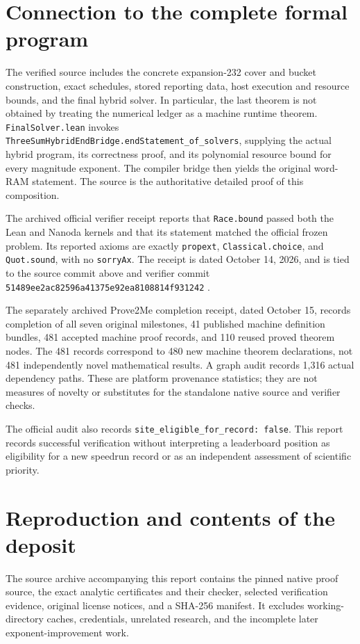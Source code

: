 \documentclass[11pt,a4paper]{article}
\newcommand{\code}[1]{\texttt{#1}}
\begin{document}
\section{Connection to the complete formal program}
The verified source includes the concrete expansion-232 cover and bucket
construction, exact schedules, stored reporting data, host execution and
resource bounds, and the final hybrid solver. In particular, the last
theorem is not obtained by treating the numerical ledger as a machine
runtime theorem. \code{FinalSolver.lean} invokes
\code{ThreeSumHybridEndBridge.endStatement\_of\_solvers}, supplying the
actual hybrid program, its correctness proof, and its polynomial resource
bound for every magnitude exponent. The compiler bridge then yields the
original word-RAM statement. The source is the authoritative detailed
proof of this composition.

The archived official verifier receipt reports that \code{Race.bound}
passed both the Lean and Nanoda kernels and that its statement matched
the official frozen problem. Its reported axioms are exactly
\code{propext}, \code{Classical.choice}, and \code{Quot.sound}, with no
\code{sorryAx}. The receipt is dated October 14, 2026, and is tied to the
source commit above and verifier commit
\code{51489ee2ac82596a41375e92ea8108814f931242} \cite{verifier}.

The separately archived Prove2Me completion receipt, dated October 15,
records completion of all seven original milestones, 41 published machine
definition bundles, 481 accepted machine proof records, and 110 reused
proved theorem nodes. The 481 records correspond to 480 new machine theorem
declarations, not 481 independently novel mathematical results. A graph
audit records 1,316 actual dependency paths. These are platform provenance
statistics; they are not measures of novelty or substitutes for the
standalone native source and verifier checks.

The official audit also records \code{site\_eligible\_for\_record: false}.
This report records successful verification without interpreting a
leaderboard position as eligibility for a new speedrun record or as an
independent assessment of scientific priority.

\section{Reproduction and contents of the deposit}
The source archive accompanying this report contains the pinned native
proof source, the exact analytic certificates and their checker, selected
verification evidence, original license notices, and a SHA-256 manifest.
It excludes working-directory caches, credentials, unrelated research,
and the incomplete later exponent-improvement work.
\end{document}
